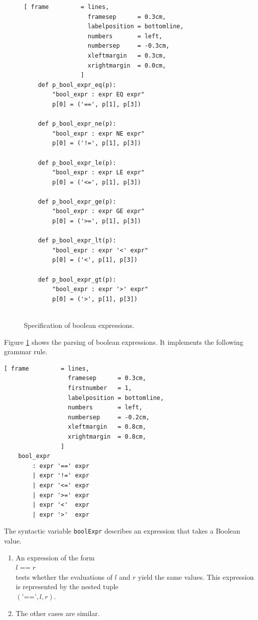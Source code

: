 \begin{figure}[!ht]
\centering
\begin{Verbatim}[ frame         = lines, 
                  framesep      = 0.3cm, 
                  labelposition = bottomline,
                  numbers       = left,
                  numbersep     = -0.3cm,
                  xleftmargin   = 0.3cm,
                  xrightmargin  = 0.0cm,
                ]
    def p_bool_expr_eq(p):
        "bool_expr : expr EQ expr"
        p[0] = ('==', p[1], p[3])
    
    def p_bool_expr_ne(p):
        "bool_expr : expr NE expr"
        p[0] = ('!=', p[1], p[3])
    
    def p_bool_expr_le(p):
        "bool_expr : expr LE expr"
        p[0] = ('<=', p[1], p[3])
        
    def p_bool_expr_ge(p):
        "bool_expr : expr GE expr"
        p[0] = ('>=', p[1], p[3])
        
    def p_bool_expr_lt(p):
        "bool_expr : expr '<' expr"
        p[0] = ('<', p[1], p[3])
    
    def p_bool_expr_gt(p):
        "bool_expr : expr '>' expr"
        p[0] = ('>', p[1], p[3])
    
\end{Verbatim}
\vspace*{-0.3cm} %
\caption{Specification of boolean expressions.}
\label{fig:Interpreter-Parser-2}
\end{figure}

Figure \ref{fig:Interpreter-Parser-2} shows the parsing of boolean expressions.  It implements the following
grammar rule.

\begin{Verbatim}[ frame         = lines, 
                  framesep      = 0.3cm, 
                  firstnumber   = 1,
                  labelposition = bottomline,
                  numbers       = left,
                  numbersep     = -0.2cm,
                  xleftmargin   = 0.8cm,
                  xrightmargin  = 0.8cm,
                ]
    bool_expr 
        : expr '==' expr     
        | expr '!=' expr     
        | expr '<=' expr     
        | expr '>=' expr     
        | expr '<'  expr      
        | expr '>'  expr     
\end{Verbatim}

The syntactic variable \texttt{boolExpr} describes an expression that takes a Boolean value.
\begin{enumerate}
\item An expression of the form
      \\[0.2cm]
      \hspace*{1.3cm}
      $l \;\texttt{==}\; r $
      \\[0.2cm]
      tests whether the evaluations of $l$ and $r$ yield the same values.
      This expression is represented by the nested tuple
      \\[0.2cm]
      \hspace*{1.3cm}
      $(\texttt{'=='}, l, r)$.
\item The other cases are similar.
\end{enumerate}
\pagebreak

